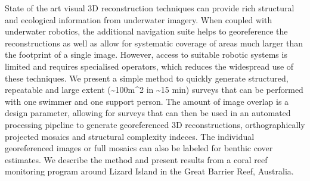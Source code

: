 
State of the art visual 3D reconstruction techniques can provide rich structural and ecological information from underwater imagery. When coupled with underwater robotics, the additional navigation suite helps to georeference the reconstructions as well as allow for systematic coverage of areas much larger than the footprint of a single image. However, access to suitable robotic systems is limited and requires specialised operators, which reduces the widespread use of these techniques. 
We present a simple method to quickly generate structured, repeatable and large extent (\sim{100m^{2}} in \sim{15 min}) surveys that can be performed with one swimmer and one support person. The amount of image overlap is a design parameter, allowing for surveys that can then be used in an automated processing pipeline to generate georeferenced 3D reconstructions, orthographically projected mosaics and structural complexity indeces. The individual georeferenced images or full mosaics can also be labeled for benthic cover estimates.
We describe the method and present results from a coral reef monitoring program around Lizard Island in the Great Barrier Reef, Australia.
  
  